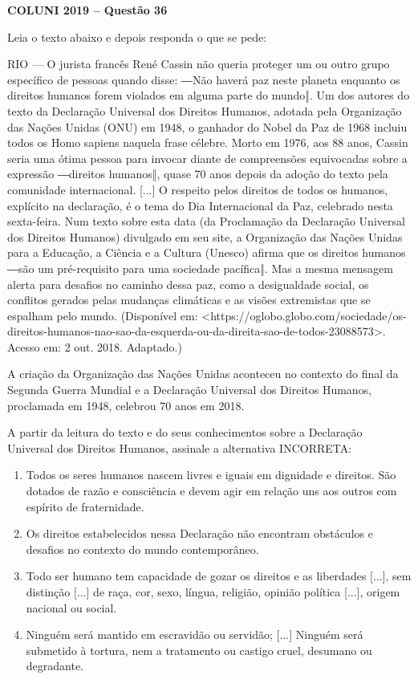 \textbf{COLUNI 2019 -- Questão 36}\par\medskip Leia o texto abaixo e depois responda o que se pede:

\par

RIO — O jurista francês René Cassin não queria proteger um ou outro grupo específico de pessoas quando disse: ―Não haverá paz neste planeta enquanto os direitos humanos forem violados em alguma parte do mundo‖. Um dos autores do texto da Declaração Universal dos Direitos Humanos, adotada pela Organização das Nações Unidas (ONU) em 1948, o ganhador do Nobel da Paz de 1968 incluiu todos os Homo sapiens naquela frase célebre. Morto em 1976, aos 88 anos, Cassin seria uma ótima pessoa para invocar diante de compreensões equivocadas sobre a expressão ―direitos humanos‖, quase 70 anos depois da adoção do texto pela comunidade internacional. [...] O respeito pelos direitos de todos os humanos, explícito na declaração, é o tema do Dia Internacional da Paz, celebrado nesta sexta-feira. Num texto sobre esta data (da Proclamação da Declaração Universal dos Direitos Humanos) divulgado em seu site, a Organização das Nações Unidas para a Educação, a Ciência e a Cultura (Unesco) afirma que os direitos humanos ―são um pré-requisito para uma sociedade pacífica‖. Mas a mesma mensagem alerta para desafios no caminho dessa paz, como a desigualdade social, os conflitos gerados pelas mudanças climáticas e as visões extremistas que se espalham pelo mundo. (Disponível em: <https://oglobo.globo.com/sociedade/os-direitos-humanos-nao-sao-da-esquerda-ou-da-direita-sao-de-todos-23088573>. Acesso em: 2 out. 2018. Adaptado.)

\par

A criação da Organização das Nações Unidas aconteceu no contexto do final da Segunda Guerra Mundial e a Declaração Universal dos Direitos Humanos, proclamada em 1948, celebrou 70 anos em 2018.

\par

A partir da leitura do texto e do seus conhecimentos sobre a Declaração Universal dos Direitos Humanos, assinale a alternativa INCORRETA:\begin{enumerate}
\item Todos os seres humanos nascem livres e iguais em dignidade e direitos. São dotados de razão e
      consciência e devem agir em relação uns aos outros com espírito de fraternidade.
\item Os direitos estabelecidos nessa Declaração não encontram obstáculos e desafios no contexto do mundo
      contemporâneo.
\item Todo ser humano tem capacidade de gozar os direitos e as liberdades [...], sem distinção [...] de raça, cor,
      sexo, língua, religião, opinião política [...], origem nacional ou social.
\item Ninguém será mantido em escravidão ou servidão; [...] Ninguém será submetido à tortura, nem a
      tratamento ou castigo cruel, desumano ou degradante.\end{enumerate}
